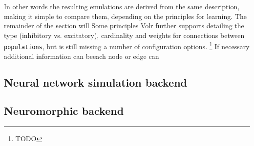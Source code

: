 \documentclass[report.tex]{subfiles}
\begin{document}
In other words the resulting emulations are derived from the same description, making it simple to compare them, depending on the principles for learning.
The remainder of the section will
Some principles
Volr further supports detailing the type (inhibitory vs. excitatory), cardinality and weights for connections between \texttt{populations}, but is still missing a number of configuration options.
\footnote{TODO}
If necessary additional information can beeach node or edge can


\subsection{Neural network simulation backend}

\subsection{Neuromorphic backend} \label{sec:neuromorphic}
\end{document}
